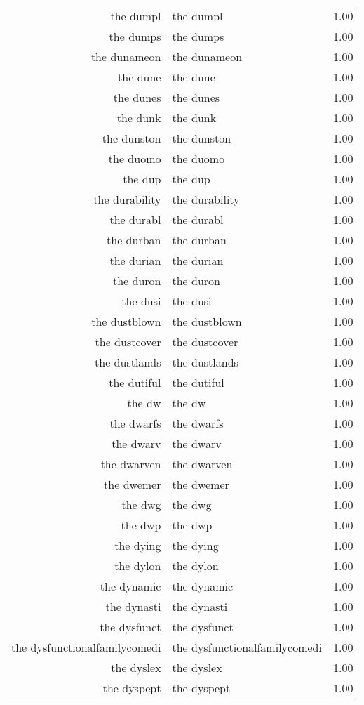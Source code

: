 \begin{table}[ht]
\begin{tabular}{rlr}
  the dumpl & the dumpl & 1.00 \\ 
  the dumps & the dumps & 1.00 \\ 
  the dunameon & the dunameon & 1.00 \\ 
  the dune & the dune & 1.00 \\ 
  the dunes & the dunes & 1.00 \\ 
  the dunk & the dunk & 1.00 \\ 
  the dunston & the dunston & 1.00 \\ 
  the duomo & the duomo & 1.00 \\ 
  the dup & the dup & 1.00 \\ 
  the durability & the durability & 1.00 \\ 
  the durabl & the durabl & 1.00 \\ 
  the durban & the durban & 1.00 \\ 
  the durian & the durian & 1.00 \\ 
  the duron & the duron & 1.00 \\ 
  the dusi & the dusi & 1.00 \\ 
  the dustblown & the dustblown & 1.00 \\ 
  the dustcover & the dustcover & 1.00 \\ 
  the dustlands & the dustlands & 1.00 \\ 
  the dutiful & the dutiful & 1.00 \\ 
  the dw & the dw & 1.00 \\ 
  the dwarfs & the dwarfs & 1.00 \\ 
  the dwarv & the dwarv & 1.00 \\ 
  the dwarven & the dwarven & 1.00 \\ 
  the dwemer & the dwemer & 1.00 \\ 
  the dwg & the dwg & 1.00 \\ 
  the dwp & the dwp & 1.00 \\ 
  the dying & the dying & 1.00 \\ 
  the dylon & the dylon & 1.00 \\ 
  the dynamic & the dynamic & 1.00 \\ 
  the dynasti & the dynasti & 1.00 \\ 
  the dysfunct & the dysfunct & 1.00 \\ 
  the dysfunctionalfamilycomedi & the dysfunctionalfamilycomedi & 1.00 \\ 
  the dyslex & the dyslex & 1.00 \\ 
  the dyspept & the dyspept & 1.00 \\ 

\end{tabular}
\end{table}

